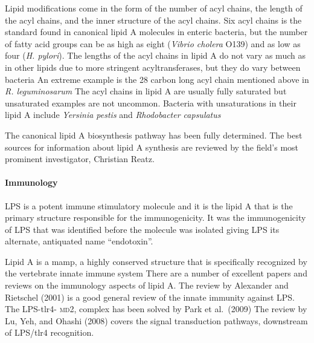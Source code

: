 Lipid modifications come in the form of the number of acyl chains, the length of the acyl chains, and the inner structure of the acyl chains. Six acyl chains is the standard found
in canonical lipid A molecules in enteric bacteria, but the number of fatty acid groups can be as high as eight (\eg \textit{Vibrio cholera}
O139) and as low as four (\eg \textit{H. pylori}). The lengths of the acyl chains in lipid A do not vary
as much as in other lipids due to more stringent acyltransferases, but they do vary between bacteria An extreme example is the 28 carbon long acyl
chain mentioned above in \textit{R. leguminosarum} The acyl chains in lipid A are usually fully saturated but unsaturated examples are not uncommon.
Bacteria with unsaturations in their lipid A include \caulobacter{} \textit{Yersinia pestis} and \textit{Rhodobacter
capsulatus}

The canonical lipid A biosynthesis pathway has been fully determined. The best sources for information about lipid A synthesis are reviewed by the field's most prominent
investigator, Christian Reatz.

    \paragraph{Immunology}

\ac{LPS} is a potent immune stimulatory molecule and it is the lipid A that is the primary structure responsible for the immunogenicity. It was the immunogenicity of \ac{LPS} that
was identified before the molecule was isolated giving \ac{LPS} its alternate, antiquated name ``endotoxin''.

Lipid A is a \ac{mamp}, a highly conserved structure that is specifically recognized by the vertebrate innate immune system There are a number of
excellent papers and reviews on the immunology aspects of lipid A. The review by Alexander and Rietschel (2001) is a good general review of the
innate immunity against \ac{LPS}. The \ac{LPS}-\ac{tlr4}- \textsc{md}2, complex has been solved by Park et al.~(2009) The review by Lu, Yeh, and
Ohashi (2008) covers the signal transduction pathways, downstream of \ac{LPS}/\ac{tlr4} recognition.

